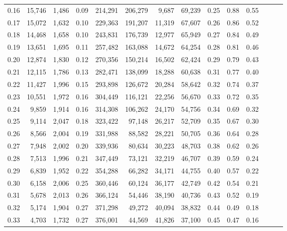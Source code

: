 \begin{tabular}{rrrrrrrrrrrrrr}
0.16 &  15,746 &  1,486 &  0.09 &  214,291 &  206,279 &   9,687 &  69,239 &  0.25 &  0.88 &      0.55 \\
0.17 &  15,072 &  1,632 &  0.10 &  229,363 &  191,207 &  11,319 &  67,607 &  0.26 &  0.86 &      0.52 \\
0.18 &  14,468 &  1,658 &  0.10 &  243,831 &  176,739 &  12,977 &  65,949 &  0.27 &  0.84 &      0.49 \\
0.19 &  13,651 &  1,695 &  0.11 &  257,482 &  163,088 &  14,672 &  64,254 &  0.28 &  0.81 &      0.46 \\
0.20 &  12,874 &  1,830 &  0.12 &  270,356 &  150,214 &  16,502 &  62,424 &  0.29 &  0.79 &      0.43 \\
0.21 &  12,115 &  1,786 &  0.13 &  282,471 &  138,099 &  18,288 &  60,638 &  0.31 &  0.77 &      0.40 \\
0.22 &  11,427 &  1,996 &  0.15 &  293,898 &  126,672 &  20,284 &  58,642 &  0.32 &  0.74 &      0.37 \\
0.23 &  10,551 &  1,972 &  0.16 &  304,449 &  116,121 &  22,256 &  56,670 &  0.33 &  0.72 &      0.35 \\
0.24 &   9,859 &  1,914 &  0.16 &  314,308 &  106,262 &  24,170 &  54,756 &  0.34 &  0.69 &      0.32 \\
0.25 &   9,114 &  2,047 &  0.18 &  323,422 &   97,148 &  26,217 &  52,709 &  0.35 &  0.67 &      0.30 \\
0.26 &   8,566 &  2,004 &  0.19 &  331,988 &   88,582 &  28,221 &  50,705 &  0.36 &  0.64 &      0.28 \\
0.27 &   7,948 &  2,002 &  0.20 &  339,936 &   80,634 &  30,223 &  48,703 &  0.38 &  0.62 &      0.26 \\
0.28 &   7,513 &  1,996 &  0.21 &  347,449 &   73,121 &  32,219 &  46,707 &  0.39 &  0.59 &      0.24 \\
0.29 &   6,839 &  1,952 &  0.22 &  354,288 &   66,282 &  34,171 &  44,755 &  0.40 &  0.57 &      0.22 \\
0.30 &   6,158 &  2,006 &  0.25 &  360,446 &   60,124 &  36,177 &  42,749 &  0.42 &  0.54 &      0.21 \\
0.31 &   5,678 &  2,013 &  0.26 &  366,124 &   54,446 &  38,190 &  40,736 &  0.43 &  0.52 &      0.19 \\
0.32 &   5,174 &  1,904 &  0.27 &  371,298 &   49,272 &  40,094 &  38,832 &  0.44 &  0.49 &      0.18 \\
0.33 &   4,703 &  1,732 &  0.27 &  376,001 &   44,569 &  41,826 &  37,100 &  0.45 &  0.47 &      0.16 \\

\end{tabular}
